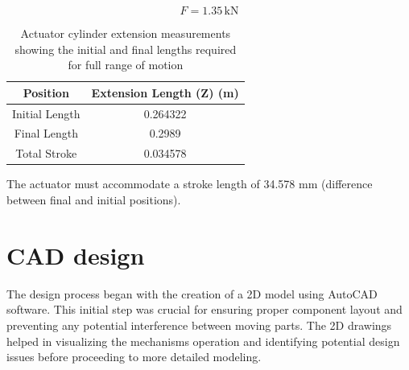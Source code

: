 \documentclass[../../main]{subfiles}
\begin{document}
\[
    F = 1.35 \, \text{kN}
\]
\begin{table}[h!]
  \centering
  \begin{tabular}{|c|c|}
      \hline \rowcolor{red!20}
      \textbf{Position} & \textbf{Extension Length (Z) (m)} \\ \hline
      Initial Length & 0.264322 \\ \hline
      Final Length & 0.2989 \\ \hline
      Total Stroke & 0.034578 \\ \hline
  \end{tabular}
  \caption{Actuator cylinder extension measurements showing the initial and final lengths required for full range of motion}
  \label{tab:extension_length}
\end{table}

The actuator must accommodate a stroke length of 34.578 mm (difference
between final and initial positions).

\section{CAD design}

The design process began with the creation of a 2D model using AutoCAD
software. This initial step was crucial for ensuring proper component
layout and preventing any potential interference between moving parts.
The 2D drawings helped in visualizing the mechanism\textquotesingle s
operation and identifying potential design issues before proceeding to
more detailed modeling.
\end{document}

